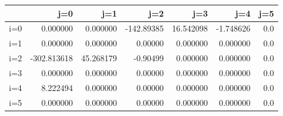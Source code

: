 \begin{tabular}{lrrrrrr}
\toprule
{} &         j=0 &        j=1 &        j=2 &        j=3 &       j=4 &  j=5 \\
\midrule
i=0 &    0.000000 &   0.000000 & -142.89385 &  16.542098 & -1.748626 &  0.0 \\
i=1 &    0.000000 &   0.000000 &    0.00000 &   0.000000 &  0.000000 &  0.0 \\
i=2 & -302.813618 &  45.268179 &   -0.90499 &   0.000000 &  0.000000 &  0.0 \\
i=3 &    0.000000 &   0.000000 &    0.00000 &   0.000000 &  0.000000 &  0.0 \\
i=4 &    8.222494 &   0.000000 &    0.00000 &   0.000000 &  0.000000 &  0.0 \\
i=5 &    0.000000 &   0.000000 &    0.00000 &   0.000000 &  0.000000 &  0.0 \\
\bottomrule
\end{tabular}
